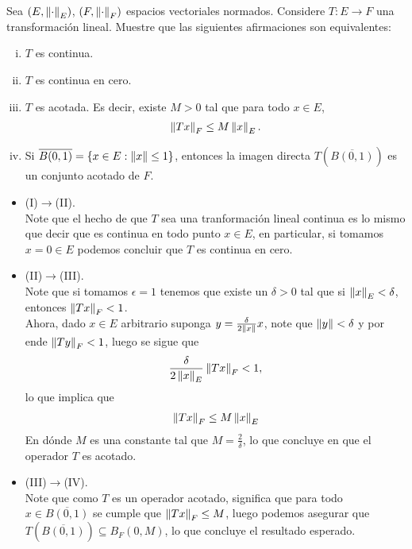 \begin{homeworkProblem}
  Sea $(E,\left\|\cdot\right\|_{E})$, $(F,\left\|\cdot\right\|_{F})$ espacios vectoriales normados. Considere $T:E\to F$ una transformación lineal. Muestre que las siguientes afirmaciones son equivalentes:
  \begin{enumerate}[(i)]
    \item $T$ es continua.
    \item $T$ es continua en cero.
    \item $T$ es acotada. Es decir, existe $M>0$ tal que para todo $x\in E$,
      \begin{align*}
        \left\|Tx\right\|_{F}\leq M\left\|x\right\|_{E}.
      \end{align*}
    \item Si $\overline{B(0,1)}=\{x\in E:\left\|x\right\|\leq 1\}$, entonces la imagen directa $T\left( \overline{B(0,1)} \right)$ es un conjunto acotado de $F$.
  \end{enumerate}
  \begin{solution}
    \begin{itemize}
      \item (I)$\to$(II).\\
        Note que el hecho de que $T$ sea una tranformación lineal continua es lo mismo que decir que es continua en todo punto $x\in E$, en particular, si tomamos $x=0\in E$ podemos concluir que $T$ es continua en cero.
      \item (II)$\to$(III).\\
        Note que si tomamos $\epsilon=1$ tenemos que existe un $\delta>0$ tal que si $\left\|x\right\|_{E}<\delta$, entonces $\left\|Tx\right\|_{F}<1$.\\
        Ahora, dado $x\in E$ arbitrario suponga $y=\frac{\delta}{2\left\|x\right\|}x$, note que $\left\|y\right\|<\delta$ y por ende $\left\|Ty\right\|_{F}<1$, luego se sigue que
        \begin{align*}
          \frac{\delta}{2\left\|x\right\|_{E}}\left\|Tx\right\|_{F}<1,
        \end{align*}
        lo que implica que
        \begin{align*}
          \left\|Tx\right\|_{F}\leq M\left\|x\right\|_{E}
        \end{align*}
        En dónde $M$ es una constante tal que $M=\frac{2}{\delta}$, lo que concluye en que el operador $T$ es acotado.
      \item (III)$\to$(IV).\\
        Note que como $T$ es un operador acotado, significa que para todo $x\in \overline{B(0,1)}$ se cumple que $\left\|Tx\right\|_{F}\leq M$, luego podemos asegurar que $T\left( \overline{B(0,1)} \right)\subseteq B_{F}(0,M)$, lo que concluye el resultado esperado.

\end{itemize}
\end{solution}
\end{homeworkProblem}

